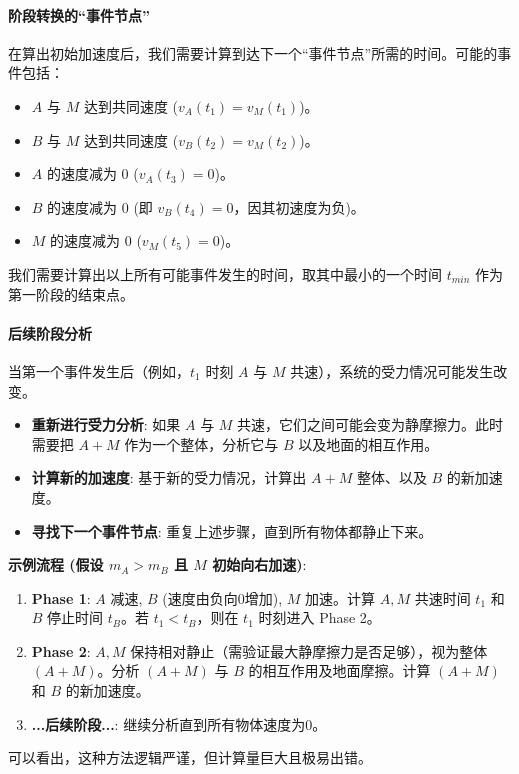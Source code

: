 \documentclass[a4paper,11pt]{ctexart}
\begin{document}
\paragraph{阶段转换的“事件节点”}
在算出初始加速度后，我们需要计算到达下一个“事件节点”所需的时间。可能的事件包括：
\begin{itemize}
    \item[\textbullet] $A$ 与 $M$ 达到共同速度 ($v_A(t_1) = v_M(t_1)$)。
    \item[\textbullet] $B$ 与 $M$ 达到共同速度 ($v_B(t_2) = v_M(t_2)$)。
    \item[\textbullet] $A$ 的速度减为 0 ($v_A(t_3) = 0$)。
    \item[\textbullet] $B$ 的速度减为 0 (即 $v_B(t_4) = 0$，因其初速度为负)。
    \item[\textbullet] $M$ 的速度减为 0 ($v_M(t_5) = 0$)。
\end{itemize}
我们需要计算出以上所有可能事件发生的时间，\textcolor{HighlightColor}{取其中最小的一个时间} $t_{min}$ 作为第一阶段的结束点。

\paragraph{后续阶段分析}
当第一个事件发生后（例如，$t_1$ 时刻 $A$ 与 $M$ 共速），系统的受力情况可能发生改变。
\begin{itemize}
    \item \textbf{重新进行受力分析}: 如果 $A$ 与 $M$ 共速，它们之间可能会变为静摩擦力。此时需要把 $A+M$ 作为一个整体，分析它与 $B$ 以及地面的相互作用。
    \item \textbf{计算新的加速度}: 基于新的受力情况，计算出 $A+M$ 整体、以及 $B$ 的新加速度。
    \item \textbf{寻找下一个事件节点}: 重复上述步骤，直到所有物体都静止下来。
\end{itemize}
\textcolor{HighlightColor}{\textbf{示例流程 (假设 $m_A > m_B$ 且 $M$ 初始向右加速)}}:
\begin{enumerate}
    \item \textbf{Phase 1}: $A$ 减速, $B$ (速度由负向0增加), $M$ 加速。计算 $A, M$ 共速时间 $t_1$ 和 $B$ 停止时间 $t_B$。若 $t_1 < t_B$，则在 $t_1$ 时刻进入 Phase 2。
    \item \textbf{Phase 2}: $A, M$ 保持相对静止（需验证最大静摩擦力是否足够），视为整体 $(A+M)$。分析 $(A+M)$ 与 $B$ 的相互作用及地面摩擦。计算 $(A+M)$ 和 $B$ 的新加速度。
    \item \textbf{...后续阶段...}: 继续分析直到所有物体速度为0。
\end{enumerate}
可以看出，这种方法逻辑严谨，但计算量巨大且极易出错。
\end{document}

